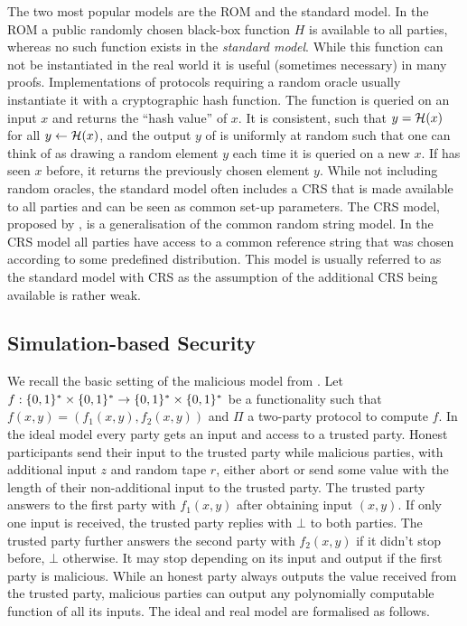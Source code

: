 The two most popular models are the \ac{ROM} and the standard model.
In the \ac{ROM} a public randomly chosen black-box function $H$ is available to all parties, whereas no such function exists in the \emph{standard model}.
While this function \RO can not be instantiated in the real world it is useful (sometimes necessary) in many proofs.
Implementations of protocols requiring a random oracle usually instantiate it with a cryptographic hash function.
The function \RO is queried on an input $x$ and returns the ``hash value'' of $x$.
It is consistent, such that $y=\mathcal{H}(x)$ for all $y\gets \mathcal{H}(x)$, and the output $y$ of \RO is uniformly at random such that one can think of \RO as drawing a random element $y$ each time it is queried on a new $x$.
If \RO has seen $x$ before, it returns the previously chosen element $y$.
While not including random oracles, the standard model often includes a \ac{CRS} that is made available to all parties and can be seen as common set-up parameters.
The \acl{CRS} model, proposed by \citet{CanettiF01}, is a generalisation of the common random string model.
In the \ac{CRS} model all parties have access to a common reference string that was chosen according to some predefined distribution.
This model is usually referred to as the standard model with \ac{CRS} as the assumption of the additional \ac{CRS} being available is rather weak.

\subsection{Simulation-based Security}\label{app:simulation}
We recall the basic setting of the malicious model from \cite{Goldreich2004}.
Let $f:\{0,1\}^\ast \times \{0,1\}^\ast \rightarrow \{0,1\}^\ast \times \{0,1\}^\ast$ be a functionality such that $f(x,y)=(f_1(x, y), f_2(x,y))$ and $\Pi$ a two-party protocol to compute $f$.
In the ideal model every party gets an input and access to a trusted party.
Honest participants send their input to the trusted party while malicious parties, with additional input $z$ and random tape $r$, either abort or send some value with the length of their non-additional input to the trusted party.
The trusted party answers to the first party with $f_1(x, y)$ after obtaining input $(x,y)$.
If only one input is received, the trusted party replies with $\bot$ to both parties.
The trusted party further answers the second party with $f_2(x,y)$ if it didn't stop before, $\bot$ otherwise.
It may stop depending on its input and output if the first party is malicious.
While an honest party always outputs the value received from the trusted party, malicious parties can output any polynomially computable function of all its inputs.
The ideal and real model are formalised as follows.

